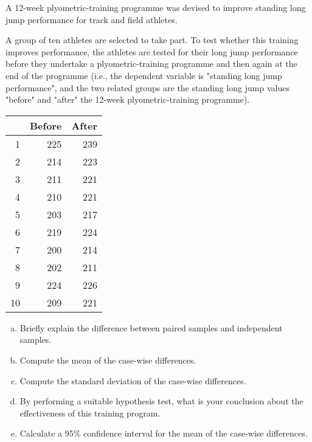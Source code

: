 \documentclass[a4paper,12pt]{article}
\begin{document}
 A 12-week plyometric-training programme was devised to improve standing long jump performance for track and field athletes.

A group of ten athletes are selected to take part. To test whether this training improves performance, the athletes are tested for their long jump performance
before they undertake a plyometric-training programme and then again at the end of the programme 
(i.e., the dependent variable is "standing long jump performance", and the two related groups are the standing long jump values "before" and "after" the 12-week plyometric-training programme).

\begin{table}[ht]
\centering
\begin{tabular}{|r|r|r|}
\hline
& Before & After \\ 
\hline
1 & 225 & 239 \\ 
2 & 214 & 223 \\ 
3 & 211 & 221 \\ 
4 & 210 & 221 \\ 
5 & 203 & 217 \\ 
6 & 219 & 224 \\ 
7 & 200 & 214 \\ 
8 & 202 & 211 \\ 
9 & 224 & 226 \\ 
10 & 209 & 221 \\ 
\hline
\end{tabular}
\end{table}

\begin{enumerate}[(a)]
\item Briefly explain the difference between paired samples and independent samples.
\item Compute the mean of the case-wise differences.
\item Compute the standard deviation of the case-wise differences.
\item By performing a suitable hypothesis test, what is your conclusion about the effectiveness of this training program. 
\item Calculate a 95\% confidence interval for the mean of the case-wise differences.

\end{enumerate}
\end{document}
